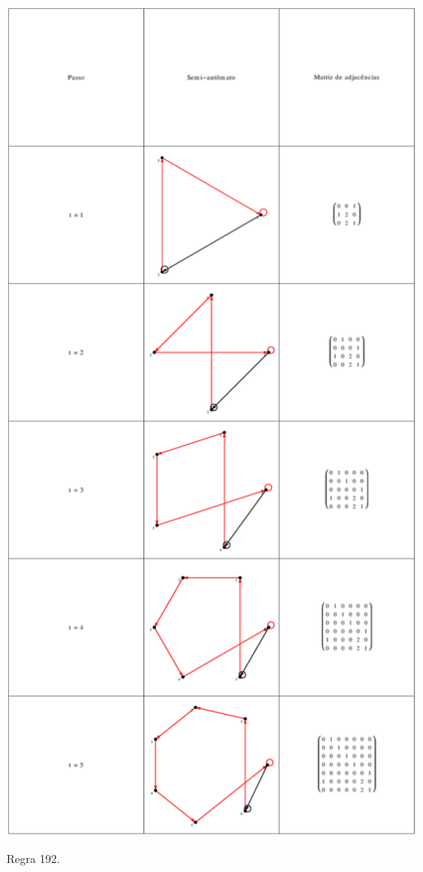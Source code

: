 \documentclass[12pt,a4paper]{article}
\begin{document}
\begin{table}[H]
\begin{center}
\includegraphics[scale=0.32]{img/mat/matr192.eps}
\caption{Regra 192.}
\label{tab:mr192}
\end{center}
\end{table}
\end{document}
